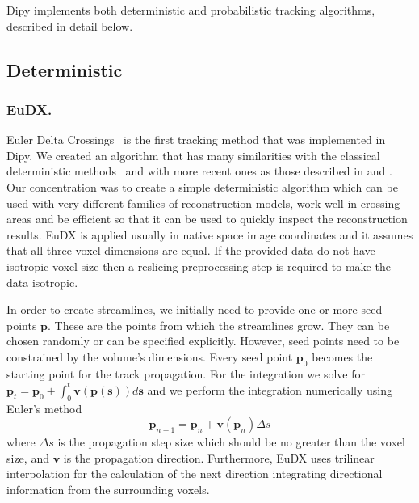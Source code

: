 \documentclass{bioinfo}
\begin{document}
Dipy implements both deterministic and probabilistic tracking algorithms,
described in detail below.

\subsection{Deterministic}

\subsubsection{EuDX.}
Euler Delta Crossings~\citep{Garyfallidis_thesis} is the first tracking
method that was implemented in Dipy. We created an algorithm that has many
similarities with the classical deterministic methods~\citep{Mori1999,
  conturo-lori-etal:99, basser-pajevic-etal:00} and with more recent ones as
those described in \citet{descoteaux-deriche-etal:09} and
\citet{yeh-etal:10}. Our concentration was to create a simple
deterministic algorithm which can be used with very different families of
reconstruction models, work well in crossing areas and be efficient so that it
can be used to quickly inspect the reconstruction results. EuDX is applied
usually in native space image coordinates and it assumes that all three voxel
dimensions are equal. If the provided data do not have
isotropic voxel size then a reslicing preprocessing step is
required to make the data isotropic.

In order to create streamlines, we initially need to provide one or more seed
points $\mathbf{p}$. These are the points from which the streamlines grow. They can
be chosen randomly or can be specified explicitly. However, seed
points need to be constrained by the volume's dimensions. Every seed point
$\mathbf{p}_{0}$ becomes the starting point for the track propagation. For the
integration we solve for
$\mathbf{p}_{t}=\mathbf{p}_{0}+\int_{0}^{t}\mathbf{v}(\mathbf{p}(\mathbf{s}))d\mathbf{s}$
and we perform the integration numerically using Euler's method
\begin{equation}
\mathbf{p}_{n+1}=\mathbf{p}_{n}+\mathbf{v}(\mathbf{p}_{n})\Delta s\label{eq:euler}
\end{equation}
\noindent where $\Delta s$ is the propagation step size which should be no
greater than the voxel size, and $\mathbf{v}$ is the propagation
direction. Furthermore, EuDX uses trilinear interpolation for the calculation
of the next direction integrating directional information from the surrounding
voxels.
\end{document}
